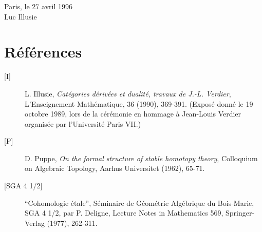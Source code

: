 \begin{flushright}
Paris, le 27 avril 1996\\
Luc Illusie
\end{flushright}

\section*{Références}

\begin{description}
\item[{[I]}] L. Illusie, \emph{Catégories dérivées et dualité, travaux de
J.-L. Verdier}, L'Enseignement Mathématique, 36 (1990), 369-391. (Exposé donné
le 19 octobre 1989, lors de la cérémonie en hommage à Jean-Louis Verdier
organisée par l'Université Paris VII.)

\item[{[P]}] D. Puppe, \emph{On the formal structure of stable homotopy
theory}, Colloquium on Algebraic Topology, Aarhus Universitet (1962), 65-71.

\item[{[SGA 4 1/2]}] ``Cohomologie étale'', Séminaire de Géométrie Algébrique
du Bois-Marie, SGA 4 1/2, par P. Deligne, Lecture Notes in Mathematics 569,
Springer-Verlag (1977), 262-311.
\end{description}

